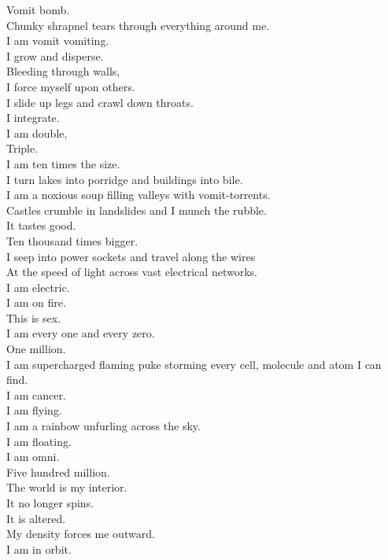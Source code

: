 Vomit bomb. \\
Chunky shrapnel tears through everything around me. \\
I am vomit vomiting. \\
I grow and disperse. \\

Bleeding through walls, \\
I force myself upon others. \\
I slide up legs and crawl down throats. \\
I integrate. \\
I am double, \\
Triple. \\
I am ten times the size. \\

I turn lakes into porridge and buildings into bile. \\
I am a noxious soup filling valleys with vomit-torrents. \\
Castles crumble in landslides and I munch the rubble. \\
It tastes good. \\

Ten thousand times bigger. \\
I seep into power sockets and travel along the wires \\
At the speed of light across vast electrical networks. \\
I am electric. \\
I am on fire. \\
This is sex. \\
I am every one and every zero. \\

One million. \\
I am supercharged flaming puke storming every cell, molecule and atom I can find. \\
I am cancer. \\
I am flying. \\
I am a rainbow unfurling across the sky. \\
I am floating. \\
I am omni. \\

Five hundred million. \\
The world is my interior. \\
It no longer spins. \\
It is altered. \\
My density forces me outward. \\
I am in orbit. \\

